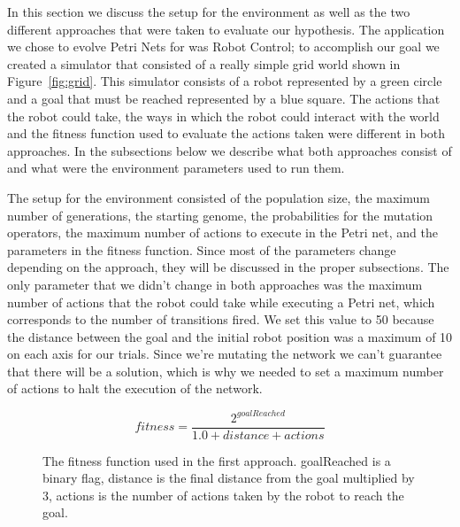 \documentclass[12pt,a4paper,twocolumn]{article}
\begin{document}
In this section we discuss the setup for the environment as well as the two different approaches that were taken to evaluate our hypothesis. The application we chose to evolve Petri Nets for was Robot Control; to accomplish our goal we created a simulator that consisted of a really simple grid world shown in Figure~\ref{fig:grid}. This simulator consists of a robot represented by a green circle and a goal that must be reached represented by a blue square. The actions that the robot could take, the ways in which the robot could interact with the world and the fitness function used to evaluate the actions taken were different in both approaches. In the subsections below we describe what both approaches consist of and what were the environment parameters used to run them.

The setup for the environment consisted of the population size, the maximum number of generations, the starting genome, the probabilities for the mutation operators, the maximum number of actions to execute in the Petri net, and the parameters in the fitness function. Since most of the parameters change depending on the approach, they will be discussed in the proper subsections. The only parameter that we didn't change in both approaches was the maximum number of actions that the robot could take while executing a Petri net, which corresponds to the number of transitions fired. We set this value to 50 because the distance between the goal and the initial robot position was a maximum of 10 on each axis for our trials. Since we're mutating the network we can't guarantee that there will be a solution, which is why we needed to set a maximum number of actions to halt the execution of the network.

\begin{figure}
\[fitness = \frac{2^{goalReached}}{1.0 + distance + actions}\]
\caption{The fitness function used in the first approach. goalReached is a binary flag, distance is the final distance from the goal multiplied by 3, actions is the number of actions taken by the robot to reach the goal.}
\label{eq:fitnessFunction}
\end{figure}
\end{document}
